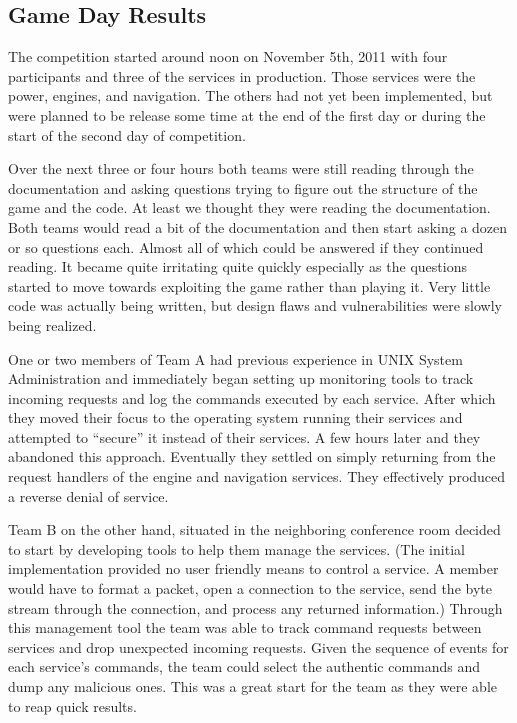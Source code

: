 \documentclass[10pt]{article}
\begin{document}
\subsection{Game Day Results}
The competition started around noon on November 5th, 2011 with four participants
and three of the services in production. Those services were the power, engines,
and navigation. The others had not yet been implemented, but were
planned to be release some time at the end of the first day or during the start
of the second day of competition.

Over the next three or four hours both teams were still reading through the
documentation and asking questions trying to figure out the structure of the
game and the code. At least we thought they were reading the documentation.
Both teams would read a bit of the documentation and then start asking a
dozen or so questions each. Almost all of which could be answered if they
continued reading. It became quite irritating quite quickly especially as
the questions started to move towards exploiting the game rather than
playing it. Very little code was actually being written, but design flaws and
vulnerabilities were slowly being realized.

One or two members of Team A had previous experience in UNIX System
Administration and immediately began setting up monitoring tools to track
incoming requests and log the commands executed by each service. After which
they moved their focus to the operating system running their services and
attempted to ``secure'' it instead of their services. A few hours later and they
abandoned this approach. Eventually they settled on simply returning from the
request handlers of the engine and navigation services. They effectively
produced a reverse denial of service.

Team B on the other hand, situated in the neighboring conference room decided to
start by developing tools to help them manage the services. (The initial
implementation provided no user friendly means to control a service. A member
would have to format a packet, open a connection to the service, send the
byte stream through the connection, and process any returned information.)
Through this management tool the team was able to track command requests between
services and drop unexpected incoming requests. Given the sequence of events for
each service's commands, the team could select the authentic commands and dump
any malicious ones. This was a great start for the team as they were able to
reap quick results.
\end{document}
